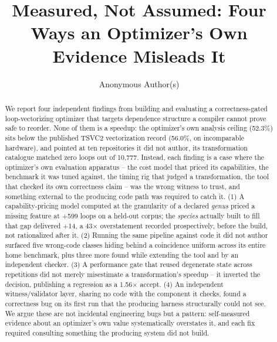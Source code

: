 \documentclass[sigconf,review,anonymous]{acmart}
\begin{document}
\title{Measured, Not Assumed: Four Ways an Optimizer's Own Evidence Misleads It}

\author{Anonymous Author(s)}

\begin{abstract}
We report four independent findings from building and evaluating a
correctness-gated loop-vectorizing optimizer that targets dependence
structure a compiler cannot prove safe to reorder. None of them is a speedup:
the optimizer's own analysis ceiling (52.3\%) sits below the published TSVC2
vectorization record (56.0\%, on incomparable hardware), and pointed at ten
repositories it did not author, its transformation catalogue matched zero
loops out of 10{,}777. Instead, each finding is a case where the optimizer's
own evaluation apparatus -- the cost model that priced its capabilities, the
benchmark it was tuned against, the timing rig that judged a transformation,
the tool that checked its own correctness claim -- was the wrong witness to
trust, and something external to the producing code path was required to
catch it. (1) A capability-pricing model computed at the granularity of a
declared \emph{genus} priced a missing feature at +599 loops on a held-out
corpus; the \emph{species} actually built to fill that gap delivered +14, a
43$\times$ overstatement recorded prospectively, before the build, not
rationalized after it. (2) Running the same pipeline against code it did not
author surfaced five wrong-code classes hiding behind a coincidence uniform
across its entire home benchmark, plus three more found while extending the
tool and by an independent checker. (3) A performance gate that reused
degenerate state across repetitions did not merely misestimate a
transformation's speedup -- it inverted the decision, publishing a
regression as a 1.56$\times$ accept. (4) An independent witness/validator
layer, sharing no code with the component it checks, found a correctness bug
on its first run that the producing harness structurally could not see. We
argue these are not incidental engineering bugs but a pattern: self-measured
evidence about an optimizer's own value systematically overstates it, and
each fix required consulting something the producing system did not build.
\end{abstract}

\maketitle
\end{document}
